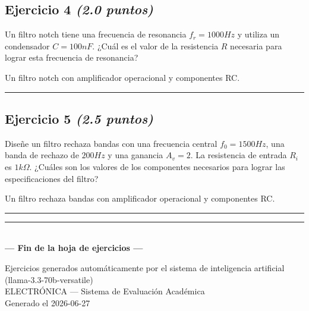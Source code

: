 \documentclass[11pt,a4paper]{article}
\begin{document}
\subsection*{Ejercicio 4 \normalfont\normalsize\textit{(2.0 puntos)}}
Un filtro notch tiene una frecuencia de resonancia $f_r = 1000 Hz$ y utiliza un condensador $C = 100 nF$. ¿Cuál es el valor de la resistencia $R$ necesaria para lograr esta frecuencia de resonancia?

  \begin{tcolorbox}[colback=gray!5, colframe=gray!40, fonttitle=\bfseries, title={Diagrama sugerido}]
    Un filtro notch con amplificador operacional y componentes RC.
  \end{tcolorbox}

\vspace{2mm}
\rule{\linewidth}{0.2pt}
\vspace{3cm}  %



\subsection*{Ejercicio 5 \normalfont\normalsize\textit{(2.5 puntos)}}
Diseñe un filtro rechaza bandas con una frecuencia central $f_0 = 1500 Hz$, una banda de rechazo de $200 Hz$ y una ganancia $A_v = 2$. La resistencia de entrada $R_i$ es $1 k\Omega$. ¿Cuáles son los valores de los componentes necesarios para lograr las especificaciones del filtro?

  \begin{tcolorbox}[colback=gray!5, colframe=gray!40, fonttitle=\bfseries, title={Diagrama sugerido}]
    Un filtro rechaza bandas con amplificador operacional y componentes RC.
  \end{tcolorbox}

\vspace{2mm}
\rule{\linewidth}{0.2pt}
\vspace{3cm}  %



\vspace{12pt}
\begin{center}
  \rule{0.6\linewidth}{0.4pt} \\[6pt]
  \textbf{--- Fin de la hoja de ejercicios ---}
\end{center}

\vfill
\begin{center}
  \footnotesize\color{gray}
  Ejercicios generados automáticamente por el sistema de inteligencia artificial (llama-3.3-70b-versatile) \\
  ELECTRÓNICA --- Sistema de Evaluación Académica \\
  Generado el 2026-06-27
\end{center}
\end{document}
